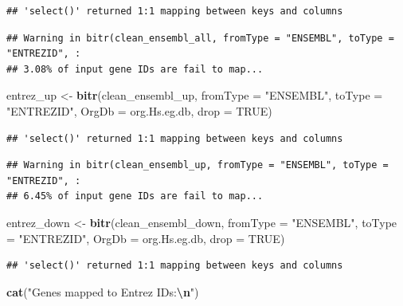 \documentclass[
]{article}
\newenvironment{Shaded}{\begin{snugshade}}{\end{snugshade}}
\newcommand{\AttributeTok}[1]{\textcolor[rgb]{0.13,0.29,0.53}{#1}}
\newcommand{\ConstantTok}[1]{\textcolor[rgb]{0.56,0.35,0.01}{#1}}
\newcommand{\FunctionTok}[1]{\textcolor[rgb]{0.13,0.29,0.53}{\textbf{#1}}}
\newcommand{\NormalTok}[1]{#1}
\newcommand{\OtherTok}[1]{\textcolor[rgb]{0.56,0.35,0.01}{#1}}
\newcommand{\SpecialCharTok}[1]{\textcolor[rgb]{0.81,0.36,0.00}{\textbf{#1}}}
\newcommand{\StringTok}[1]{\textcolor[rgb]{0.31,0.60,0.02}{#1}}
\begin{document}
\begin{verbatim}
## 'select()' returned 1:1 mapping between keys and columns
\end{verbatim}

\begin{verbatim}
## Warning in bitr(clean_ensembl_all, fromType = "ENSEMBL", toType = "ENTREZID", :
## 3.08% of input gene IDs are fail to map...
\end{verbatim}

\begin{Shaded}
\begin{Highlighting}[]
\NormalTok{entrez\_up }\OtherTok{\textless{}{-}} \FunctionTok{bitr}\NormalTok{(clean\_ensembl\_up,}
                  \AttributeTok{fromType =} \StringTok{"ENSEMBL"}\NormalTok{, }
                  \AttributeTok{toType =} \StringTok{"ENTREZID"}\NormalTok{,}
                  \AttributeTok{OrgDb =}\NormalTok{ org.Hs.eg.db,}
                  \AttributeTok{drop =} \ConstantTok{TRUE}\NormalTok{)}
\end{Highlighting}
\end{Shaded}

\begin{verbatim}
## 'select()' returned 1:1 mapping between keys and columns
\end{verbatim}

\begin{verbatim}
## Warning in bitr(clean_ensembl_up, fromType = "ENSEMBL", toType = "ENTREZID", :
## 6.45% of input gene IDs are fail to map...
\end{verbatim}

\begin{Shaded}
\begin{Highlighting}[]
\NormalTok{entrez\_down }\OtherTok{\textless{}{-}} \FunctionTok{bitr}\NormalTok{(clean\_ensembl\_down,}
                    \AttributeTok{fromType =} \StringTok{"ENSEMBL"}\NormalTok{,}
                    \AttributeTok{toType =} \StringTok{"ENTREZID"}\NormalTok{, }
                    \AttributeTok{OrgDb =}\NormalTok{ org.Hs.eg.db,}
                    \AttributeTok{drop =} \ConstantTok{TRUE}\NormalTok{)}
\end{Highlighting}
\end{Shaded}

\begin{verbatim}
## 'select()' returned 1:1 mapping between keys and columns
\end{verbatim}

\begin{Shaded}
\begin{Highlighting}[]
\FunctionTok{cat}\NormalTok{(}\StringTok{"Genes mapped to Entrez IDs:}\SpecialCharTok{\textbackslash{}n}\StringTok{"}\NormalTok{)}
\end{Highlighting}
\end{Shaded}
\end{document}
